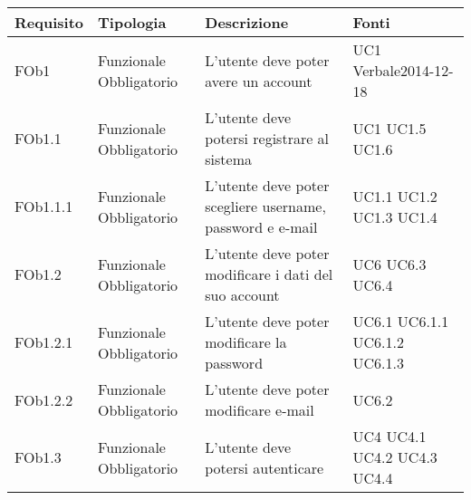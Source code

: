 \begin{longtable}{|l|p{2.5cm}|p{5cm}|p{3.5cm}|}
\hline
\textbf{Requisito} & \textbf{Tipologia} & \textbf{Descrizione} & \textbf{Fonti} \\
\hline
FOb1 & Funzionale \linebreak Obbligatorio & L'utente deve poter avere un account & UC1 \linebreak Verbale2014-12-18 \linebreak \\
\hline
FOb1.1 & Funzionale \linebreak Obbligatorio & L'utente deve potersi registrare al sistema & UC1 \linebreak  UC1.5 \linebreak  UC1.6 \linebreak  \\
\hline
FOb1.1.1 & Funzionale \linebreak Obbligatorio & L'utente deve poter scegliere username, password e e-mail & UC1.1 \linebreak  UC1.2 \linebreak  UC1.3 \linebreak  UC1.4 \linebreak  \\
\hline
FOb1.2 & Funzionale \linebreak Obbligatorio & L'utente deve poter modificare i dati del suo account & UC6 \linebreak  UC6.3 \linebreak  UC6.4 \linebreak  \\
\hline
FOb1.2.1 & Funzionale \linebreak Obbligatorio & L'utente deve poter modificare la password & UC6.1 \linebreak  UC6.1.1 \linebreak  UC6.1.2 \linebreak  UC6.1.3 \linebreak  \\
\hline
FOb1.2.2 & Funzionale \linebreak Obbligatorio & L'utente deve poter modificare e-mail & UC6.2 \linebreak  \\
\hline
FOb1.3 & Funzionale \linebreak Obbligatorio & L'utente deve potersi autenticare & UC4 \linebreak  UC4.1 \linebreak  UC4.2 \linebreak  UC4.3 \linebreak  UC4.4 \linebreak  \\

\end{longtable}
